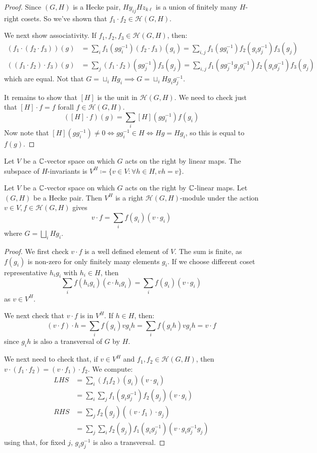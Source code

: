 \documentclass[10pt,a4paper]{article}
\begin{document}
\begin{proof}
  Since $(G,H)$ is a Hecke pair, $Hy_{ij}Hz_{k\ell}$ is a union of finitely many $H$-right cosets. So we've shown that $f_1\cdot f_2 \in \mathcal{H}(G,H)$.

  We next show associativity. If $f_1, f_2, f_3 \in \mathcal{H}(G,H)$, then:
  \begin{align*}
    (f_1\cdot(f_2\cdot f_3))(g) &= \sum_i f_1(gg_i^{-1})(f_2\cdot f_3)(g_i) = \sum_{i,j} f_1(gg_i^{-1})f_2(g_ig_j^{-1})f_3(g_j)\\
    ((f_1\cdot f_2)\cdot f_3)(g) &= \sum_j (f_1\cdot f_2)(gg_j^{-1})f_3(g_j) = \sum_{i,j} f_1(gg_j^{-1}g_jg_i^{-1})f_2(g_ig_j^{-1})f_3(g_j)
  \end{align*}
  which are equal. Not that $G = \sqcup_i Hg_i \implies G = \sqcup_i Hg_ig_j^{-1}$.

  It remains to show that $[H]$ is the unit in $\mathcal{H}(G,H)$. We need to check just that $[H]\cdot f = f$ forall $f \in \mathcal{H}(G,H)$.
  \[([H]\cdot f)(g) = \sum_{i}[H](gg_i^{-1})f(g_i)\]
  Now note that $[H](gg_i^{-1}) \neq 0 \iff gg_i^{-1} \in H \iff Hg=Hg_i$, so this is equal to $f(g)$.
\end{proof}
\begin{definition}
  Let $V$ be a $\mathbb{C}$-vector space on which $G$ acts on the right by linear maps. The subspace of $H$-invariants is $V^H \coloneqq \{v \in V : \forall h \in H, vh = v\}$.
\end{definition}
\begin{proposition}
  Let $V$ be a $\mathbb{C}$-vector space on which $G$ acts on the right by $\mathbb{C}$-linear maps. Let $(G,H)$ be a Hecke pair. Then $V^H$ is a right $\mathcal{H}(G,H)$-module under the action $v\in V, f\in \mathcal{H}(G,H)$ gives
  \[ v\cdot f = \sum_{i} f(g_i)(v\cdot g_i)\]
  where $G = \bigsqcup_i Hg_i$.
\end{proposition}
\begin{proof}
  We first check $v \cdot f$ is a well defined element of $V$. The sum is finite, as $f(g_i)$ is non-zero for only finitely many elements $g_i$. If we choose different coset representative $h_i g_i$ with $h_i \in H$, then
  \[\sum_i f(h_ig_i)(c \cdot h_i g_i) = \sum_{i} f(g_i)(v\cdot g_i)\]
  as $v \in V^H$.

  We next check that $v\cdot f$ is in $V^H$. If $h \in H$, then:
  \[(v\cdot f)\cdot h = \sum_i f(g_i) vg_i h = \sum_i f(g_i h)vg_i h = v\cdot f\]
  since $g_i h$ is also a transversal of $G$ by $H$.

  We next need to check that, if $v \in V^H$ and $f_1, f_2 \in \mathcal{H}(G,H)$, then $v\cdot(f_1\cdot f_2) = (v\cdot f_1)\cdot f_2$. We compute:
  \begin{align*}
    LHS &= \sum_i (f_1 f_2)(g_i)(v\cdot g_i)\\
    &= \sum_i \sum_j f_1(g_i g_j^{-1})f_2(g_j)(v\cdot g_i)\\
    RHS &= \sum_j f_2(g_j)((v\cdot f_1)\cdot g_j)\\
    &= \sum_j \sum_i f_2(g_j)f_1(g_ig_j^{-1})(v\cdot g_ig_j^{-1}g_j)
  \end{align*}
  using that, for fixed $j$, $g_ig_j^{-1}$ is also a transversal.
\end{proof}
\end{document}
